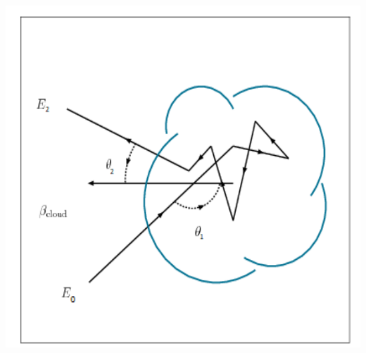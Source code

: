 \begin{frame}{}
\begin{columns}
            \begin{column}{0.4\textwidth} %
                \includegraphics[width=1.16\textwidth]{Figures/fermisecondorder.png}
            \end{column}
        \end{columns}
    \end{frame}
    
